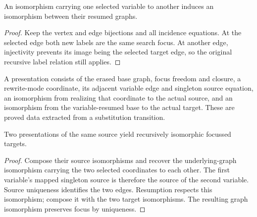 \begin{lemma}
An isomorphism carrying one selected variable to another induces an isomorphism
between their resumed graphs.
\end{lemma}
\begin{proof}
Keep the vertex and edge bijections and all incidence equations. At the selected
edge both new labels are the same search focus. At another edge, injectivity
prevents its image being the selected target edge, so the original recursive
label relation still applies.
\end{proof}
\begin{definition}
A presentation consists of the erased base graph, focus freedom and closure,
a rewrite-mode coordinate, its adjacent variable edge and singleton source
equation, an isomorphism from realizing that coordinate to the actual source,
and an isomorphism from the variable-resumed base to the actual target.
These are proved data extracted from a substitution transition.
\end{definition}


\begin{theorem}
Two presentations of the same source yield recursively isomorphic focussed targets.
\end{theorem}
\begin{proof}
Compose their source isomorphisms and recover the underlying-graph isomorphism
carrying the two selected coordinates to each other. The first variable's
mapped singleton source is therefore the source of the second variable.
Source uniqueness identifies the two edges. Resumption respects this
isomorphism; compose it with the two target isomorphisms. The resulting graph
isomorphism preserves focus by uniqueness.
\end{proof}


